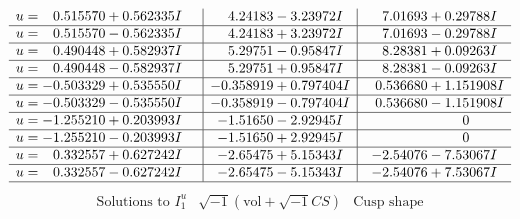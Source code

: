 \documentclass[1p]{elsarticle_modified}
\theoremstyle{definition}
\newcommand{\I}{\sqrt{-1}}
\begin{document}
$$\begin{array}{c|c|c}
\begin{aligned}
u &= \phantom{-}0.515570 + 0.562335 I\end{aligned}
 & \phantom{-}4.24183 - 3.23972 I & \phantom{-}7.01693 + 0.29788 I \\ \hline\begin{aligned}
u &= \phantom{-}0.515570 - 0.562335 I\end{aligned}
 & \phantom{-}4.24183 + 3.23972 I & \phantom{-}7.01693 - 0.29788 I \\ \hline\begin{aligned}
u &= \phantom{-}0.490448 + 0.582937 I\end{aligned}
 & \phantom{-}5.29751 - 0.95847 I & \phantom{-}8.28381 + 0.09263 I \\ \hline\begin{aligned}
u &= \phantom{-}0.490448 - 0.582937 I\end{aligned}
 & \phantom{-}5.29751 + 0.95847 I & \phantom{-}8.28381 - 0.09263 I \\ \hline\begin{aligned}
u &= -0.503329 + 0.535550 I\end{aligned}
 & -0.358919 + 0.797404 I & \phantom{-}0.536680 + 1.151908 I \\ \hline\begin{aligned}
u &= -0.503329 - 0.535550 I\end{aligned}
 & -0.358919 - 0.797404 I & \phantom{-}0.536680 - 1.151908 I \\ \hline\begin{aligned}
u &= -1.255210 + 0.203993 I\end{aligned}
 & -1.51650 - 2.92945 I & \phantom{-0.000000 } 0 \\ \hline\begin{aligned}
u &= -1.255210 - 0.203993 I\end{aligned}
 & -1.51650 + 2.92945 I & \phantom{-0.000000 } 0 \\ \hline\begin{aligned}
u &= \phantom{-}0.332557 + 0.627242 I\end{aligned}
 & -2.65475 + 5.15343 I & -2.54076 - 7.53067 I \\ \hline\begin{aligned}
u &= \phantom{-}0.332557 - 0.627242 I\end{aligned}
 & -2.65475 - 5.15343 I & -2.54076 + 7.53067 I\\
 \hline 
 \end{array}$$\newpage$$\begin{array}{c|c|c}  
\text{Solutions to }I^u_{1}& \I (\text{vol} + \sqrt{-1}CS) & \text{Cusp shape}\\

\end{array}$$
\end{document}
